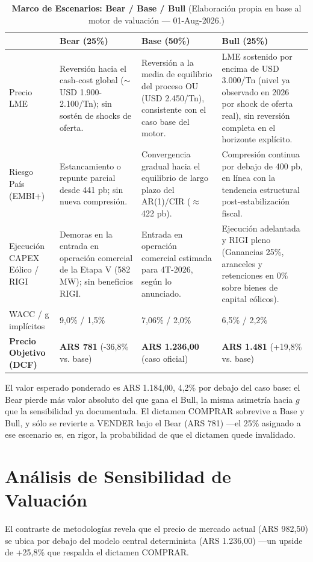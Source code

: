 \documentclass[10pt,a4paper]{article}
\begin{document}
\begin{table}[H]
\centering
\caption{\textbf{Marco de Escenarios: Bear / Base / Bull} {\small\color{gsgray} (Elaboración propia en base al motor de valuación — 01-Aug-2026.)}}
\scriptsize
\begin{tabular}{p{2.6cm}p{3.7cm}p{3.7cm}p{3.7cm}}
\toprule
 & \textbf{Bear (25\%)} & \textbf{Base (50\%)} & \textbf{Bull (25\%)} \\
\midrule
Precio LME & Reversión hacia el cash-cost global ($\sim$USD 1.900-2.100/Tn); sin sostén de shocks de oferta. & Reversión a la media de equilibrio del proceso OU (USD 2.450/Tn), consistente con el caso base del motor. & LME sostenido por encima de USD 3.000/Tn (nivel ya observado en 2026 por shock de oferta real), sin reversión completa en el horizonte explícito. \\
Riesgo País (EMBI+) & Estancamiento o repunte parcial desde 441 pb; sin nueva compresión. & Convergencia gradual hacia el equilibrio de largo plazo del AR(1)/CIR ($\approx$422 pb). & Compresión continua por debajo de 400 pb, en línea con la tendencia estructural post-estabilización fiscal. \\
Ejecución CAPEX Eólico / RIGI & Demoras en la entrada en operación comercial de la Etapa V (582 MW); sin beneficios RIGI. & Entrada en operación comercial estimada para 4T-2026, según lo anunciado. & Ejecución adelantada y RIGI pleno (Ganancias 25\%, aranceles y retenciones en 0\% sobre bienes de capital eólicos). \\
WACC / g implícitos & 9,0\% / 1,5\% & 7,06\% / 2,0\% & 6,5\% / 2,2\% \\
\textbf{Precio Objetivo (DCF)} & \textbf{ARS 781} (-36,8\% vs. base) & \textbf{ARS 1.236,00} (caso oficial) & \textbf{ARS 1.481} (+19,8\% vs. base) \\
\bottomrule
\end{tabular}
\end{table}

El valor esperado ponderado es ARS 1.184,00, 4,2\% por debajo del caso base: el Bear pierde más valor absoluto del que gana el Bull, la misma asimetría hacia $g$ que la sensibilidad ya documentada. El dictamen COMPRAR sobrevive a Base y Bull, y sólo se revierte a VENDER bajo el Bear (ARS 781) —el 25\% asignado a ese escenario es, en rigor, la probabilidad de que el dictamen quede invalidado.

\section{Análisis de Sensibilidad de Valuación}
El contraste de metodologías revela que el precio de mercado actual (ARS 982,50) se ubica por debajo del modelo central determinista (ARS 1.236,00) —un upside de +25,8\% que respalda el dictamen COMPRAR.
\end{document}
